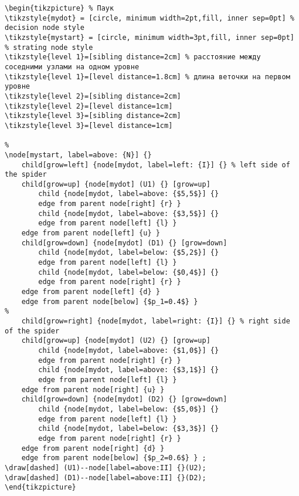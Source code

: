 \documentclass[12pt,a4paper]{article}
\begin{document}
\begin{verbatim}
\begin{tikzpicture} % Паук
\tikzstyle{mydot} = [circle, minimum width=2pt,fill, inner sep=0pt] % decision node style
\tikzstyle{mystart} = [circle, minimum width=3pt,fill, inner sep=0pt] % strating node style
\tikzstyle{level 1}=[sibling distance=2cm] % расстояние между соседними узлами на одном уровне
\tikzstyle{level 1}=[level distance=1.8cm] % длина веточки на первом уровне
\tikzstyle{level 2}=[sibling distance=2cm]
\tikzstyle{level 2}=[level distance=1cm]
\tikzstyle{level 3}=[sibling distance=2cm]
\tikzstyle{level 3}=[level distance=1cm]

%
\node[mystart, label=above: {N}] {}
    child[grow=left] {node[mydot, label=left: {I}] {} % left side of the spider
    child[grow=up] {node[mydot] (U1) {} [grow=up]
        child {node[mydot, label=above: {$5,5$}] {}
        edge from parent node[right] {r} }
        child {node[mydot, label=above: {$3,5$}] {}
        edge from parent node[left] {l} }
    edge from parent node[left] {u} }
    child[grow=down] {node[mydot] (D1) {} [grow=down]
        child {node[mydot, label=below: {$5,2$}] {}
        edge from parent node[left] {l} }
        child {node[mydot, label=below: {$0,4$}] {}
        edge from parent node[right] {r} }
    edge from parent node[left] {d} }
    edge from parent node[below] {$p_1=0.4$} }
%
    child[grow=right] {node[mydot, label=right: {I}] {} % right side of the spider
    child[grow=up] {node[mydot] (U2) {} [grow=up]
        child {node[mydot, label=above: {$1,0$}] {}
        edge from parent node[right] {r} }
        child {node[mydot, label=above: {$3,1$}] {}
        edge from parent node[left] {l} }
    edge from parent node[right] {u} }
    child[grow=down] {node[mydot] (D2) {} [grow=down]
        child {node[mydot, label=below: {$5,0$}] {}
        edge from parent node[left] {l} }
        child {node[mydot, label=below: {$3,3$}] {}
        edge from parent node[right] {r} }
    edge from parent node[right] {d} }
    edge from parent node[below] {$p_2=0.6$} } ;
\draw[dashed] (U1)--node[label=above:II] {}(U2);
\draw[dashed] (D1)--node[label=above:II] {}(D2);
\end{tikzpicture}
        
\end{verbatim}
\end{document}

